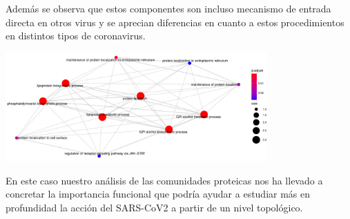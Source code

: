 Además se observa que estos componentes son incluso mecanismo de entrada directa en otros virus y se aprecian diferencias en cuanto a estos procedimientos en distintos tipos de coronavirus.

\vspace{1.5ex}
\begin{center}
\includegraphics[width=100mm,scale=1.1]{report/figures/enrichGO_enrich_map-BP-79.pdf}
\end{center}
\vspace{1.5ex}

En este caso nuestro análisis de las comunidades proteicas nos ha llevado a concretar la importancia funcional que podría ayudar a estudiar más en profundidad la acción del SARS-CoV2 a partir de un nivel topológico. 

